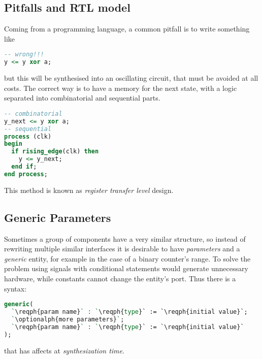 \subsection{Pitfalls and RTL model}
Coming from a programming language, a common pitfall is to write something like
\begin{center}
  \begin{minipage}{.4\linewidth}
    \begin{lstlisting}[language=vhdl]
-- wrong!!!
y <= y xor a;
    \end{lstlisting}
  \end{minipage}
  \begin{minipage}{.4\linewidth}
    \centering
    \ttfamily
  \end{minipage}
\end{center}
but this will be synthesised into an oscillating circuit, that must be avoided
at all costs. The correct way is to have a memory for the next state, with a
logic separated into combinatorial and sequential parts.
\begin{lstlisting}[language=vhdl]
-- combinatorial
y_next <= y xor a;
-- sequential
process (clk)
begin
  if rising_edge(clk) then
    y <= y_next;
  end if;
end process;
\end{lstlisting}
This method is known as \emph{register transfer level} design.

\subsection{Generic Parameters}
Sometimes a group of components have a very similar structure, so instead of
rewriting multiple similar interfaces it is desirable to have \emph{parameters}
and a \emph{generic} entity, for example in the case of a binary counter's
range. To solve the problem using signals with conditional statements would
generate unnecessary hardware, while constants cannot change the entity's port.
Thus there is a syntax:
\begin{lstlisting}[language=vhdl]
generic(
  `\reqph{param name}` : `\reqph{type}` := `\reqph{initial value}`;
  `\optionalph{more parameters}`;
  `\reqph{param name}` : `\reqph{type}` := `\reqph{initial value}`
);
\end{lstlisting}
that has affects at \emph{synthesization time}.

